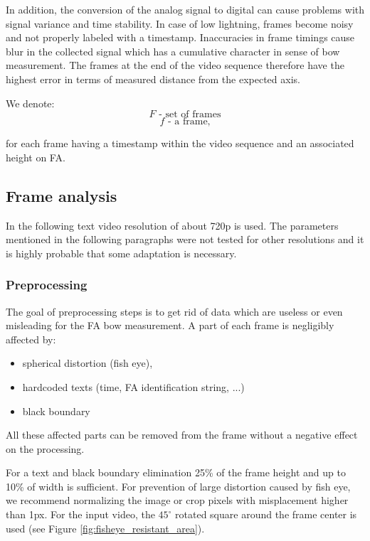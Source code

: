 \documentclass[preprint,12pt]{elsarticle}
\begin{document}
In addition, the conversion of the analog signal to digital can cause problems with signal variance and time stability. In case of low lightning, frames become noisy and not properly labeled with a timestamp. Inaccuracies in frame timings cause blur in the collected signal which has a cumulative character in sense of bow measurement. The frames at the end of the video sequence therefore have the highest error in terms of measured distance from the expected axis.

We denote:
\begin{equation}
    F \text{ - set of frames}
\end{equation}
\begin{equation}
    f \text{ - a frame,}
\end{equation}

for each frame having a timestamp within the video sequence and an associated height on \ac{FA}.

\subsection{Frame analysis}

In the following text video resolution of about 720p is used. The parameters mentioned in the following paragraphs were not tested for other resolutions and it is highly probable that some adaptation is necessary.

\subsubsection{Preprocessing}

The goal of preprocessing steps is to get rid of data which are useless or even misleading for the \ac{FA} bow measurement. A part of each frame is negligibly affected by: 
\begin{itemize}
\item{spherical distortion (fish eye),}
\item{hardcoded texts (time, \ac{FA} identification string, ...)}

\item{black boundary}
\end{itemize}
All these affected parts can be removed from the frame without a negative effect on the processing.

For a text and black boundary elimination 25\% of the frame height and up to 10\% of width is sufficient. For prevention of large distortion caused by fish eye, we recommend normalizing the image or crop pixels with misplacement higher than 1px. For the input video, the $45^\circ$ rotated square around the frame center is used (see Figure \ref{fig:fisheye_resistant_area}). 
\end{document}
